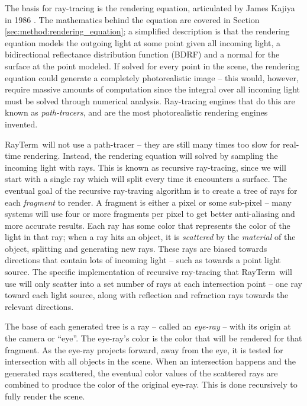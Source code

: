 \documentclass[11pt]{article}
\newcommand{\name}{{\sc RayTerm}}
\begin{document}
The basis for ray-tracing is the rendering equation, articulated by James Kajiya in 1986 \cite{kajiya1986rendering}.
The mathematics behind the equation are covered in Section \ref{sec:method:rendering_equation}; a simplified description is that the rendering equation models the outgoing light at some point given all incoming light, a bidirectional reflectance distribution function (BDRF) and a normal for the surface at the point modeled.
If solved for every point in the scene, the rendering equation could generate a completely photorealistic image -- this would, however, require massive amounts of computation since the integral over all incoming light must be solved through numerical analysis.
Ray-tracing engines that do this are known as {\it path-tracers}, and are the most photorealistic rendering engines invented.

\name\ will not use a path-tracer -- they are still many times too slow for real-time rendering.
Instead, the rendering equation will solved by sampling the incoming light with rays.
This is known as recursive ray-tracing, since we will start with a single ray which will split every time it encounters a surface.
The eventual goal of the recursive ray-traving algorithm is to create a tree of rays for each {\it fragment} to render.
A fragment is either a pixel or some sub-pixel -- many systems will use four or more fragments per pixel to get better anti-aliasing and more accurate results.
Each ray has some color that represents the color of the light in that ray; when a ray hits an object, it is {\it scattered} by the {\it material} of the object, splitting and generating new rays.
These rays are biased towards directions that contain lots of incoming light -- such as towards a point light source.
The specific implementation of recursive ray-tracing that \name\ will use will only scatter into a set number of rays at each intersection point -- one ray toward each light source, along with reflection and refraction rays towards the relevant directions.

The base of each generated tree is a ray -- called an {\it eye-ray} -- with its origin at the camera or ``eye''.
The eye-ray's color is the color that will be rendered for that fragment.
As the eye-ray projects forward, away from the eye, it is tested for intersection with all objects in the scene.
When an intersection happens and the generated rays scattered, the eventual color values of the scattered rays are combined to produce the color of the original eye-ray.
This is done recursively to fully render the scene.
\end{document}
